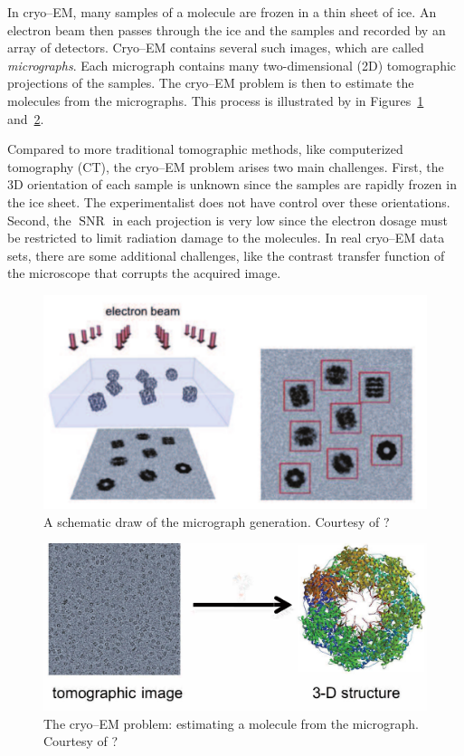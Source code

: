 \documentclass[journal]{IEEEtran}
\numberwithin{equation}{section}
\numberwithin{figure}{section}
\theoremstyle{plain}
\theoremstyle{definition}
\theoremstyle{remark}
\theoremstyle{plain}
\theoremstyle{remark}
\theoremstyle{plain}
\theoremstyle{plain}
\newcommand{\SNR}{\operatorname{SNR}}
\begin{document}
In cryo--EM, many samples of a molecule are frozen in a thin sheet of ice. 
An electron beam then passes through the ice and the samples  and recorded by an array of detectors. Cryo--EM contains several such images, which are
called \emph{micrographs}. Each micrograph  contains many two-dimensional (2D) tomographic projections of the samples. 
 The  cryo--EM problem is then to estimate the molecules from the micrographs. This process is illustrated by in Figures~\ref{fig:cryo-EM} and~\ref{fig:cryo-EM-problem}. 

Compared to more traditional tomographic methods, like computerized tomography (CT), the cryo--EM problem arises two main challenges. First, the 3D orientation of each sample is unknown since the samples are rapidly frozen in the ice sheet. The experimentalist does not have control over these orientations. Second, the $\SNR$ in each projection is very low since the electron dosage must be restricted to limit  radiation damage to the molecules. In real cryo--EM data sets, there are some additional challenges, like the contrast transfer function of the microscope that corrupts the acquired image. 


\begin{figure}
	\begin{center}
		\includegraphics[scale = .4]{cryoem-eps-converted-to}
	\end{center}
	\caption{A schematic draw of the micrograph generation. Courtesy of ?}
	\label{fig:cryo-EM}
\end{figure}

\begin{figure}
	\begin{center}
		\includegraphics[scale = .35]{cryoem-problem-eps-converted-to}		
	\end{center}
	\caption{The cryo--EM problem: estimating a molecule from the micrograph. Courtesy of ?}
	\label{fig:cryo-EM-problem}
\end{figure}
\end{document}

